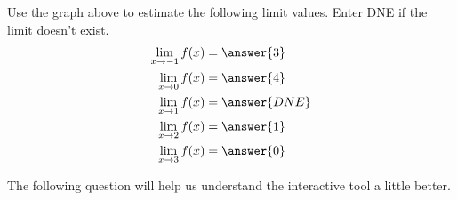 \documentclass{ximera}
\begin{document}
\begin{exercise}
   	\begin{question} Use the graph above to estimate the following limit values.  Enter DNE if the limit doesn't exist.
   		\begin{align*}
   			\lim\limits_{x \to -1}f(x) &= \answer{3} \\
   			\lim\limits_{x \to 0}f(x) &= \answer{4} \\
   			\lim\limits_{x \to 1}f(x) &= \answer{DNE} \\
   			\lim\limits_{x \to 2}f(x) &= \answer{1} \\
   			\lim\limits_{x \to 3}f(x) &= \answer{0} 
   		\end{align*}
   	\end{question}
   	
   	The following question will help us understand the interactive tool a little better.
   	

\end{exercise}
\end{document}
